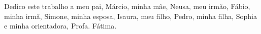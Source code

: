 Dedico este trabalho a meu pai, Márcio, minha mãe, Neusa,  meu irmão, Fábio, minha irmã, Simone, minha esposa, Isaura,  meu filho, Pedro, minha filha, Sophia e minha orientadora, Profa. Fátima.